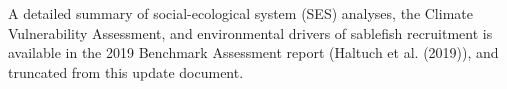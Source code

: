 \documentclass[11pt,
  english,
  a4paper,
]{article}
\begin{document}
\leavevmode\tagmcend\tagstructend


A detailed summary of social-ecological system (SES) analyses, the Climate Vulnerability Assessment, and environmental drivers of sablefish recruitment is available in the 2019 Benchmark Assessment report ({Haltuch et al. (2019)\leavevmode\tagmcend\tagstructend}), and truncated from this update document.

\leavevmode\tagmcend\tagstructend\par

\end{document}
